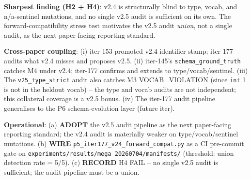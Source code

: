 \noindent\textbf{Sharpest finding (H2 + H4)}: v2.4 is structurally
blind to type, vocab, and n/a-sentinel mutations, and no single v2.5
audit is sufficient on its own. The forward-compatibility stress
test motivates the v2.5 audit \emph{union}, not a single audit,
as the next paper-facing reporting standard.

\noindent\textbf{Cross-paper coupling}: (i) iter-153 promoted v2.4
identifier-stamp; iter-177 audits what v2.4 misses and proposes
v2.5. (ii) iter-145's \texttt{schema\_ground\_truth} catches M4
under v2.4; iter-177 confirms and extends to type/vocab/sentinel.
(iii) The \texttt{v25\_type\_strict} audit also catches
M3 VOCAB\_VIOLATION (since \texttt{int} 1 is not in the heldout
vocab) -- the type and vocab audits are not independent; this
collateral coverage is a v2.5 bonus. (iv) The iter-177 audit
pipeline generalises to the P6 schema-evolution layer (future iter).

\noindent\textbf{Operational}: (a) \textbf{ADOPT} the v2.5 audit
pipeline as the next paper-facing reporting standard; the v2.4
audit is materially weaker on type/vocab/sentinel mutations.
(b) \textbf{WIRE} \texttt{p5\_iter177\_v24\_forward\_compat.py}
as a CI pre-commit gate on
\texttt{experiments/results/mega\_20260704/manifests/}
(threshold: union detection rate = 5/5).
(c) \textbf{RECORD} H4 FAIL -- no single v2.5 audit is sufficient;
the audit pipeline must be a union.